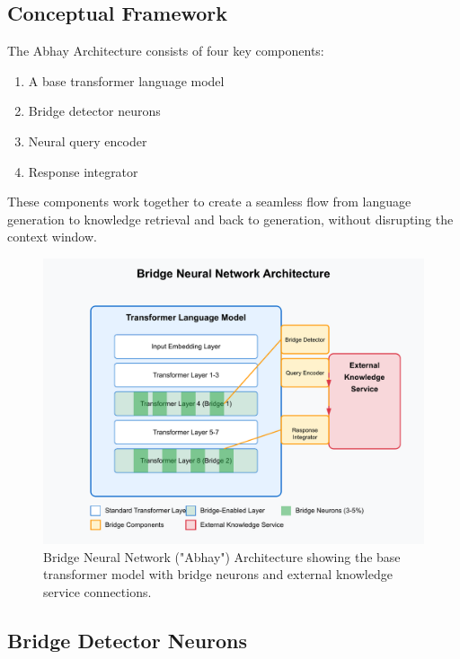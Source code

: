 \documentclass[9pt,a4paper,twocolumn,twoside]{tau-class/tau}
\begin{document}
\subsection{Conceptual Framework}

    The Abhay Architecture consists of four key components:
    \begin{enumerate}
        \item A base transformer language model
        \item Bridge detector neurons
        \item Neural query encoder
        \item Response integrator
    \end{enumerate}

    These components work together to create a seamless flow from language generation to knowledge retrieval and back to generation, without disrupting the context window.

    \begin{figure}[h]
        \centering
        \includegraphics[width=\columnwidth]{figures/figure1_bridge_architecture.pdf}
        \caption{Bridge Neural Network ("Abhay") Architecture showing the base transformer model with bridge neurons and external knowledge service connections.}
        \label{fig:architecture}
    \end{figure}

\subsection{Bridge Detector Neurons}
\end{document}
